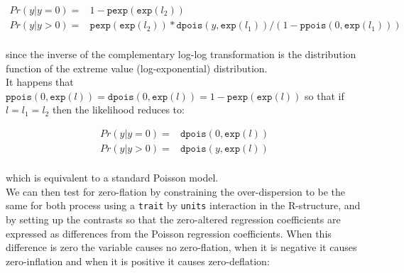 \documentclass{article}
\begin{document}
\begin{equation} 
\begin{array}{rl}
Pr(y | y=0) =& 1-\texttt{pexp}(\texttt{exp}(l_{2}))\\
Pr(y | y>0) =& \texttt{pexp}(\texttt{exp}(l_{2}))\ast \texttt{dpois}(y, \texttt{exp}(l_{1}))/(1-\texttt{ppois}(0, \texttt{exp}(l_{1})))\\
\end{array}
\end{equation}

since the inverse of the complementary log-log transformation is the distribution function of the extreme value (log-exponential) distribution.\\

It happens that $\texttt{ppois}(0,\texttt{exp}(l)) = \texttt{dpois}(0,\texttt{exp}(l)) = 1-\texttt{pexp}(\texttt{exp}(l))$ so that if $l = l_{1} = l_{2}$ then the likelihood reduces to:

\begin{equation} 
\begin{array}{rl}
Pr(y | y=0) =& \texttt{dpois}(0,\texttt{exp}(l))\\
Pr(y | y>0) =& \texttt{dpois}(y, \texttt{exp}(l))\\
\end{array}
\end{equation}

which is equivalent to a standard Poisson model.\\

We can then test for zero-flation by constraining the over-dispersion to be the same for both process using a \texttt{trait} by \texttt{units} interaction in the R-structure, and by setting up the contrasts so that the zero-altered regression coefficients are expressed as differences from the Poisson regression coefficients. When this difference is zero the variable causes no zero-flation, when it is negative it causes zero-inflation and when it is positive it causes zero-deflation:
  
\end{document}
